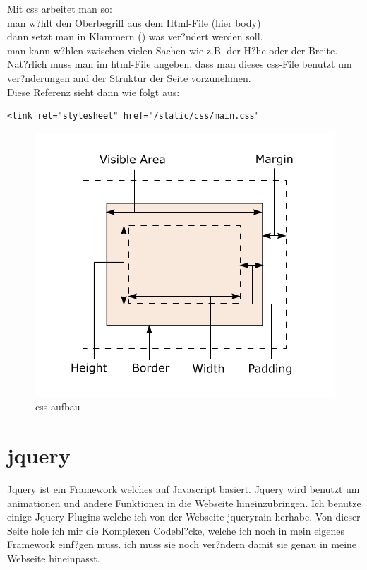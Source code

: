 \documentclass{article}
\begin{document}
Mit css arbeitet man so:\\
man w?hlt den Oberbegriff aus dem Html-File (hier body)\\
dann setzt man in Klammern ({}) was ver?ndert werden soll.\\
man kann w?hlen zwischen vielen Sachen wie z.B. der H?he oder der Breite.\\
Nat?rlich muss man im html-File angeben, dass man dieses css-File benutzt um
ver?nderungen and der Struktur der Seite vorzunehmen.\\
Diese Referenz sieht dann wie folgt aus:


\begin{lstlisting}
<link rel="stylesheet" href="/static/css/main.css"
\end{lstlisting}


\begin{figure}[ht]
    \centering
    \includegraphics[width=.7\linewidth]{css-box}
    \caption{css aufbau}
    \label{fig:sub1}
    \end{figure}

\cleardoublepage


\section{jquery}






Jquery ist ein Framework welches auf Javascript basiert.
Jquery wird benutzt um animationen und andere Funktionen in die Webseite hineinzubringen.
Ich benutze einige Jquery-Plugins welche ich von der Webseite jqueryrain herhabe.
Von dieser Seite hole ich mir die Komplexen Codebl?cke, welche ich noch in mein eigenes Framework einf?gen muss.
ich muss sie noch ver?ndern damit sie genau in meine Webseite hineinpasst.
\end{document}
